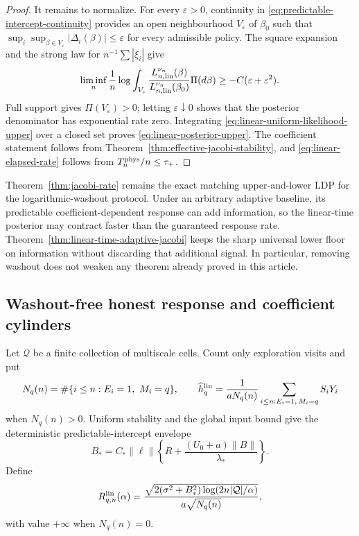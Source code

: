 \begin{proof}
It remains to normalize.  For every \(\varepsilon>0\), continuity in
\eqref{eq:predictable-intercept-continuity} provides an open neighbourhood
\(V_\varepsilon\) of \(\beta_0\) such that
\(\sup_i\sup_{\beta\in V_\varepsilon}|\Delta_i(\beta)|\le\varepsilon\)
for every admissible policy.  The square expansion and the strong law for
\(n^{-1}\sum|\xi_i|\) give
\[
 \liminf_n\frac1n\log
 \int_{V_\varepsilon}
 \frac{L_{n,{\rm lin}}^{\nu_n}(\beta)}
      {L_{n,{\rm lin}}^{\nu_n}(\beta_0)}\Pi(d\beta)
 \ge-C(\varepsilon+\varepsilon^2).
\]
Full support gives \(\Pi(V_\varepsilon)>0\); letting
\(\varepsilon\downarrow0\) shows that the posterior denominator has
exponential rate zero.  Integrating
\eqref{eq:linear-uniform-likelihood-upper} over a closed set proves
\eqref{eq:linear-posterior-upper}.  The coefficient statement follows from
Theorem~\ref{thm:effective-jacobi-stability}, and
\eqref{eq:linear-elapsed-rate} follows from
\(T_n^{\rm phys}/n\le\tau_+\).
\end{proof}

\begin{remark}
Theorem~\ref{thm:jacobi-rate} remains the exact matching upper-and-lower LDP
for the logarithmic-washout protocol.  Under an arbitrary adaptive baseline,
its predictable coefficient-dependent response can add information, so the
linear-time posterior may contract faster than the guaranteed response rate.
Theorem~\ref{thm:linear-time-adaptive-jacobi} keeps the sharp universal lower
floor on information without discarding that additional signal.  In
particular, removing washout does not weaken any theorem already proved in
this article.
\end{remark}

\subsection{Washout-free honest response and coefficient cylinders}

Let \(\mathcal Q\) be a finite collection of multiscale cells.  Count only
exploration visits and put
\[
 N_q(n)=\#\{i\le n:E_i=1,\ M_i=q\},
 \qquad
 \widehat h_q^{\rm lin}
 =\frac1{aN_q(n)}
   \sum_{i\le n:E_i=1,\,M_i=q}S_iY_i
\]
when \(N_q(n)>0\).  Uniform stability and the global input bound give the
deterministic predictable-intercept envelope
\begin{equation}
 B_* = C_*\|\ell\|\left\{R+
       \frac{(U_0+a)\|B\|}{\lambda_*}\right\}.
 \label{eq:linear-intercept-envelope}
\end{equation}
Define
\begin{equation}
 R_{q,n}^{\rm lin}(\alpha)=
 \frac{\sqrt{2(\sigma^2+B_*^2)
 \log(2n|\mathcal Q|/\alpha)}}{a\sqrt{N_q(n)}},
 \label{eq:linear-confidence-radius}
\end{equation}
with value \(+\infty\) when \(N_q(n)=0\).

